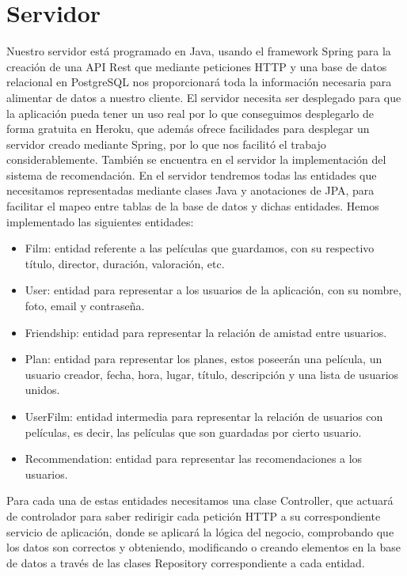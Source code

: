 \section{Servidor}
\label{makereference4.2}
Nuestro servidor está programado en Java, usando el framework Spring para la creación de una API Rest que mediante peticiones HTTP y una base de datos relacional en PostgreSQL nos proporcionará
toda la información necesaria para alimentar de datos a nuestro cliente. El servidor necesita ser desplegado para que la aplicación pueda tener un uso real por lo que conseguimos desplegarlo de forma gratuita en Heroku, que además ofrece
facilidades para desplegar un servidor creado mediante Spring, por lo que nos facilitó el trabajo considerablemente. También se encuentra en el servidor la implementación del sistema de recomendación.
En el servidor tendremos todas las entidades que necesitamos representadas mediante clases Java y anotaciones de JPA, para facilitar el mapeo entre tablas de la base de datos y dichas entidades. Hemos implementado las siguientes entidades:
\begin{itemize}
    \item Film: entidad referente a las películas que guardamos, con su respectivo título, director, duración, valoración, etc.
    \item User: entidad para representar a los usuarios de la aplicación, con su nombre, foto, email y contraseña.
    \item Friendship: entidad para representar la relación de amistad entre usuarios.
    \item Plan: entidad para representar los planes, estos poseerán una película, un usuario creador, fecha, hora, lugar, título, descripción y una lista de usuarios unidos.
    \item UserFilm: entidad intermedia para representar la relación de usuarios con películas, es decir, las películas que son guardadas por cierto usuario.
    \item Recommendation: entidad para representar las recomendaciones a los usuarios.
\end{itemize}
Para cada una de estas entidades necesitamos una clase Controller, que actuará de controlador para saber redirigir cada petición HTTP a su correspondiente servicio de aplicación, donde se aplicará la lógica del negocio, comprobando 
que los datos son correctos y obteniendo, modificando o creando elementos en la base de datos a través de las clases Repository correspondiente a cada entidad.

